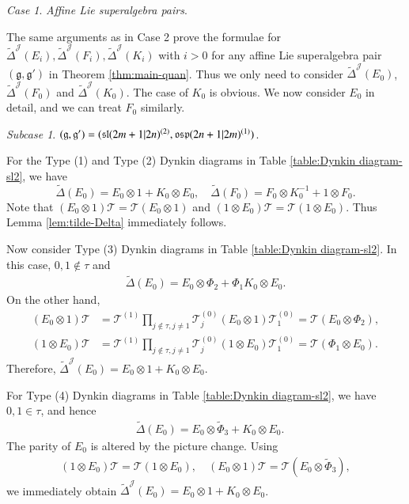 \documentclass[12pt]{amsart}
\theoremstyle{definition}
\theoremstyle{remark}
\numberwithin{equation}{section}
\newtheorem{case}{Case}
\newtheorem{subcase}{Subcase}[case]
\begin{document}
\begin{case}
{\em Affine Lie superalgebra pairs}.
\end{case}

The same arguments as in Case 2 prove the formulae for ${\tilde{\Delta}}^{{\mathcal J}}(E_i), {\tilde{\Delta}}^{{\mathcal J}}(F_i),
{\tilde{\Delta}}^{{\mathcal J}}(K_i)$ with $i>0$ for any affine Lie superalgebra pair $({{\mathfrak g}},{{\mathfrak g}}')$ in Theorem \ref{thm:main-quan}. 
Thus we only need to consider ${\tilde{\Delta}}^{{\mathcal J}}(E_0)$, ${\tilde{\Delta}}^{{\mathcal J}}(F_0)$ and ${\tilde{\Delta}}^{{\mathcal J}}(K_0)$. The case of $K_0$ is obvious. We now consider $E_0$ in detail, and  we can treat $F_0$ similarly.

\begin{subcase}
$({{\mathfrak g}},{{\mathfrak g}}')=({{\rm\mathfrak{sl}}}(2m+1|2n)^{(2)}, {{\rm\mathfrak{osp}}}(2n+1|2m)^{(1)})$.
\end{subcase}

For the Type (1) and Type (2) Dynkin diagrams in Table \ref{table:Dynkin diagram-sl2},
we have
\[
{\tilde{\Delta}}(E_0)=E_0\otimes 1+ K_0\otimes E_0, \quad {\tilde{\Delta}}(F_0)=F_0\otimes  K_0^{-1}+1 \otimes F_0.
\]
Note that $(E_0\otimes 1){{\mathscr T}}={{\mathscr T}}(E_0\otimes 1)$ and $(1\otimes E_0){{\mathscr T}}={{\mathscr T}}(1\otimes E_0)$. Thus Lemma \ref{lem:tilde-Delta} immediately follows.

Now consider Type (3) Dynkin diagrams in Table \ref{table:Dynkin diagram-sl2}. In this case, $0,1\notin\tau$   and
\[\begin{aligned}
{\tilde{\Delta}}(E_0)=E_0\otimes \Phi_2+\Phi_1K_0\otimes E_0.
\end{aligned}\]
On the other hand,
\[\begin{aligned}
(E_0\otimes 1){{\mathscr T}}&={{\mathscr T}}^{(1)}\prod_{j\notin\tau,j\ne 1}{{\mathscr T}}^{(0)}_j (E_0\otimes 1){{\mathscr T}}^{(0)}_1={{\mathscr T}}(E_0\otimes\Phi_2),\\
(1\otimes E_0){{\mathscr T}}&={{\mathscr T}}^{(1)}\prod_{j\notin\tau,j\ne 1}{{\mathscr T}}^{(0)}_j (1\otimes E_0){{\mathscr T}}^{(0)}_1={{\mathscr T}}(\Phi_1\otimes E_0).
\end{aligned}\]
Therefore,
$
{\tilde{\Delta}}^{{\mathcal J}}(E_0)=E_0\otimes 1+ K_0\otimes E_0.
$

For Type (4) Dynkin diagrams in Table \ref{table:Dynkin diagram-sl2},
we have $0,1\in\tau$,  and hence
\[\begin{aligned}
&{\tilde{\Delta}}(E_0)=E_0\otimes \tilde{\Phi}_3+ K_0\otimes E_0.
\end{aligned}\]
The parity of $E_0$ is altered by the  picture change.
Using
\[\begin{aligned}
(1\otimes E_0){{\mathscr T}}=  {{\mathscr T}}( 1\otimes E_0),\quad (E_0\otimes 1){{\mathscr T}}={{\mathscr T}}(E_0\otimes \tilde{\Phi}_3),
\end{aligned}\]
we immediately obtain  ${\tilde{\Delta}}^{{\mathcal J}}(E_0)=E_0\otimes 1+ K_0\otimes E_0$.
\end{document}
